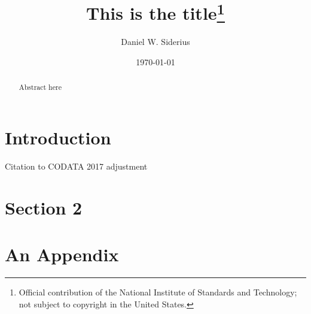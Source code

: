 \documentclass[preprint,pre,showkeys,12pt,superscriptaddress,nofootinbib]{revtex4-1}
\begin{document}
\title{This is the title\footnote{Official contribution of the National Institute of Standards and Technology; not subject to copyright in the United States.}} 


\author{Daniel W. Siderius}


\date{\today}

\begin{abstract}
Abstract here
\end{abstract}

\maketitle

\newpage
\section{Introduction}\label{sec:intro}
\lipsum[1]


Citation to CODATA 2017 adjustment\cite{Newell_CODATA_2017}

\section{Section 2}
\lipsum[2-3]

\appendix
\section{An Appendix}




%
\end{document}
